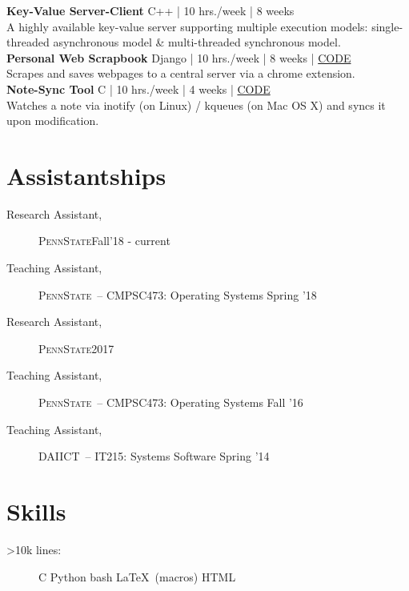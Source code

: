 \documentclass[margin]{res}
\newcommand{\daiict}{\textsc{DAIICT}}
\newcommand{\psu}{\textsc{PennState}}
\begin{document}
\begin{resume}
{\bfseries Key-Value Server-Client}\hfill
{\small C++ | 10 hrs./week | 8 weeks}\\
A highly available key-value server supporting multiple execution models:
single-threaded asynchronous model \& multi-threaded synchronous model.\\[2ex]

{\bfseries Personal Web Scrapbook}\hfill
{\small Django | 10 hrs./week | 8 weeks | \href{https://bitbucket.org/mitthu/capsule/src/}{CODE}}\\
Scrapes and saves webpages to a central server via a chrome extension.\\[2ex]

{\bfseries Note-Sync Tool}\hfill
{\small C | 10 hrs./week | 4 weeks | \href{https://github.com/mitthu/note-sync}{CODE}}\\
Watches a note via inotify (on Linux) / kqueues (on Mac OS X) and syncs it upon modification.

\section{Assistantships} 
\begin{description}
    \item[Research Assistant,] \psu \hfill Fall'18 - current
    \item[Teaching Assistant,] \psu\ -- CMPSC473: Operating Systems \hfill Spring '18 %
    \item[Research Assistant,] \psu \hfill 2017
    \item[Teaching Assistant,] \psu\ -- CMPSC473: Operating Systems \hfill Fall '16 %
    \item[Teaching Assistant,] \daiict\ -- IT215: Systems Software \hfill Spring '14 %
\end{description}

\section{Skills}
\begin{description}
    \item[>10k lines:]
        C \textbullet{}
        Python \textbullet{}
        bash \textbullet{}
        \LaTeX\ (macros) \textbullet{}
        HTML


\end{description}
\end{resume}
\end{document}
